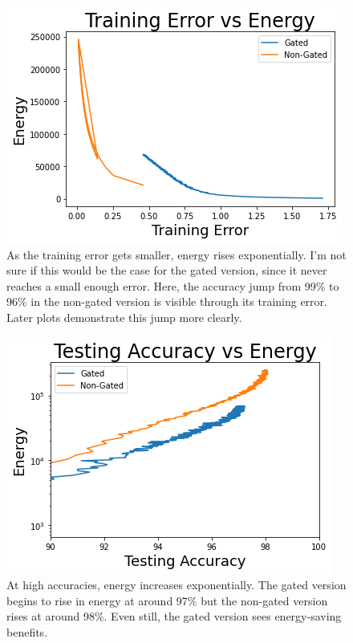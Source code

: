 \documentclass[prl,superscriptaddress,showpacs,twocolumn]{revtex4-1}
\begin{document}
\begin{figure}[H]
    \centering
    \includegraphics[width=\linewidth]{figures/training_error_vs_energy.png}
    \caption{As the training error gets smaller, energy rises exponentially.  I'm not sure if this would be the case for the gated version, since it never reaches a small enough error. Here, the accuracy jump from 99\% to 96\% in the non-gated version is visible through its training error. Later plots demonstrate this jump more clearly.}
    \label{fig:train_err_vs_energy}
\end{figure}

\begin{figure}[H]
    \centering
    \includegraphics[width=\linewidth]{figures/testing_accuracy_vs_energy.png}
    \caption{At high accuracies, energy increases exponentially. The gated version begins to rise in energy at around 97\% but the non-gated version rises at around 98\%. Even still, the gated version sees energy-saving benefits.}
    \label{fig:test_acc_vs_energy}
\end{figure}
\end{document}
